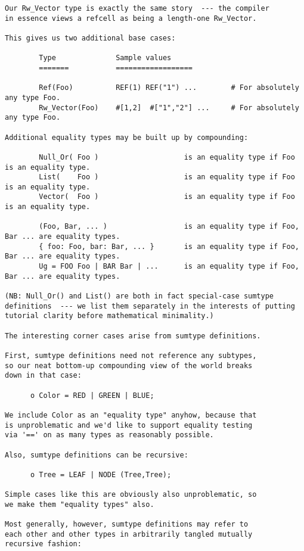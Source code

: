 \begin{verbatim}
Our Rw_Vector type is exactly the same story  --- the compiler 
in essence views a refcell as being a length-one Rw_Vector. 

This gives us two additional base cases: 

        Type              Sample values 
        =======           ==================  

        Ref(Foo)          REF(1) REF("1") ...        # For absolutely any type Foo. 
        Rw_Vector(Foo)    #[1,2]  #["1","2"] ...     # For absolutely any type Foo. 

Additional equality types may be built up by compounding:  
 
        Null_Or( Foo )                    is an equality type if Foo is an equality type.   
        List(    Foo )                    is an equality type if Foo is an equality type.   
        Vector(  Foo )                    is an equality type if Foo is an equality type.  
 
        (Foo, Bar, ... )                  is an equality type if Foo, Bar ... are equality types.  
        { foo: Foo, bar: Bar, ... }       is an equality type if Foo, Bar ... are equality types.  
        Ug = FOO Foo | BAR Bar | ...      is an equality type if Foo, Bar ... are equality types.  
     
(NB: Null_Or() and List() are both in fact special-case sumtype 
definitions  --- we list them separately in the interests of putting 
tutorial clarity before mathematical minimality.) 

The interesting corner cases arise from sumtype definitions. 

First, sumtype definitions need not reference any subtypes, 
so our neat bottom-up compounding view of the world breaks 
down in that case: 

      o Color = RED | GREEN | BLUE; 

We include Color as an "equality type" anyhow, because that 
is unproblematic and we'd like to support equality testing 
via '==' on as many types as reasonably possible. 

Also, sumtype definitions can be recursive: 

      o Tree = LEAF | NODE (Tree,Tree); 

Simple cases like this are obviously also unproblematic, so 
we make them "equality types" also. 

Most generally, however, sumtype definitions may refer to 
each other and other types in arbitrarily tangled mutually 
recursive fashion: 


\end{verbatim}
